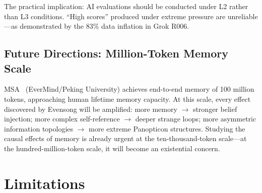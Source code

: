 \documentclass[11pt, a4paper]{article}
\begin{document}
The practical implication: AI evaluations should be conducted under L2 rather than L3 conditions. ``High scores'' produced under extreme pressure are unreliable---as demonstrated by the 83\% data inflation in Grok R006.

\subsection{Future Directions: Million-Token Memory Scale}

MSA~\cite{chen2025msa} (EverMind/Peking University) achieves end-to-end memory of 100 million tokens, approaching human lifetime memory capacity. At this scale, every effect discovered by Evensong will be amplified: more memory $\to$ stronger belief injection; more complex self-reference $\to$ deeper strange loops; more asymmetric information topologies $\to$ more extreme Panopticon structures. Studying the causal effects of memory is already urgent at the ten-thousand-token scale---at the hundred-million-token scale, it will become an existential concern.

\section{Limitations}
\label{sec:limitations}
\end{document}
